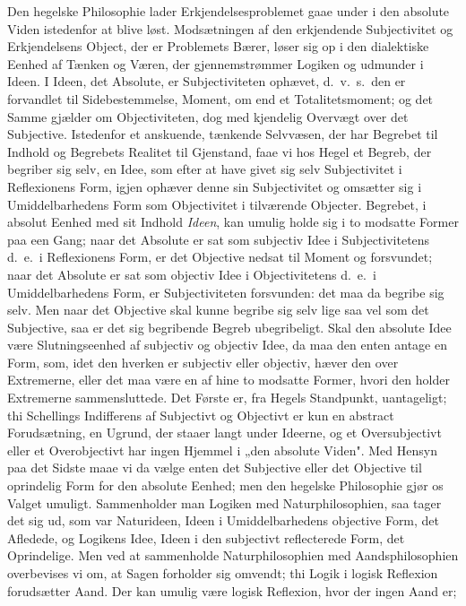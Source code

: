 \documentclass[12pt]{article}
\newcommand{\opage}[1]{\marginnote{\footnotesize\textit{[#1]}}}
\begin{document}
Den hegelske Philosophie lader Erkjendelsesproblemet gaae
under i den absolute Viden istedenfor at blive løst.
Modsætningen af den erkjendende Subjectivitet og Erkjendelsens
Object, der er Problemets Bærer, løser sig op i den dialektiske
Eenhed af Tænken og Væren, der gjennemstrømmer Logiken
\opage{22} og udmunder i Ideen. I Ideen, det Absolute, er Subjectiviteten
ophævet, d.\ v.\ s.\ den er forvandlet til Sidebestemmelse, Moment,
om end et Totalitetsmoment; og det Samme gjælder om
Objectiviteten, dog med kjendelig Overvægt over det Subjective.
Istedenfor et anskuende, tænkende Selvvæsen, der har Begrebet
til Indhold og Begrebets Realitet til Gjenstand, faae vi hos
Hegel et Begreb, der begriber sig selv, en Idee, som efter at have
givet sig selv Subjectivitet i Reflexionens Form, igjen ophæver
denne sin Subjectivitet og omsætter sig i Umiddelbarhedens
Form som Objectivitet i tilværende Objecter. Begrebet, i
absolut Eenhed med sit Indhold \emph{Ideen}, kan umulig holde sig i
to modsatte Former paa een Gang; naar det Absolute er sat
som subjectiv Idee i Subjectivitetens d.\ e.\ i Reflexionens Form,
er det Objective nedsat til Moment og forsvundet; naar det
Absolute er sat som objectiv Idee i Objectivitetens d.\ e.\ i
Umiddelbarhedens Form, er Subjectiviteten forsvunden: det
maa da begribe sig selv. Men naar det Objective skal kunne
begribe sig selv lige saa vel som det Subjective, saa er det sig
begribende Begreb ubegribeligt. Skal den absolute Idee være
Slutningseenhed af subjectiv og objectiv Idee, da maa den enten
antage en Form, som, idet den hverken er subjectiv eller
objectiv, hæver den over Extremerne, eller det maa være
en af hine to modsatte Former, hvori den holder Extremerne
sammensluttede. Det Første er, fra Hegels Standpunkt,
uantageligt; thi Schellings Indifferens af Subjectivt og Objectivt
er kun en abstract Forudsætning, en Ugrund, der staaer langt
under Ideerne, og et Oversubjectivt eller et Overobjectivt har
ingen Hjemmel i „den absolute Viden". Med Hensyn paa det
Sidste maae vi da vælge enten det Subjective eller det Objective
til oprindelig Form for den absolute Eenhed; men den hegelske
Philosophie gjør os Valget umuligt. Sammenholder man Logiken
med Naturphilosophien, saa tager det sig ud, som var
Naturideen, Ideen i Umiddelbarhedens objective Form, det Afledede,
og Logikens Idee, Ideen i den subjectivt reflecterede Form, det
Oprindelige. Men ved at sammenholde Naturphilosophien med
Aandsphilosophien overbevises vi om, at Sagen forholder sig
\opage{23} omvendt; thi Logik i logisk Reflexion forudsætter Aand. Der
kan umulig være logisk Reflexion, hvor der ingen Aand er;
\end{document}
